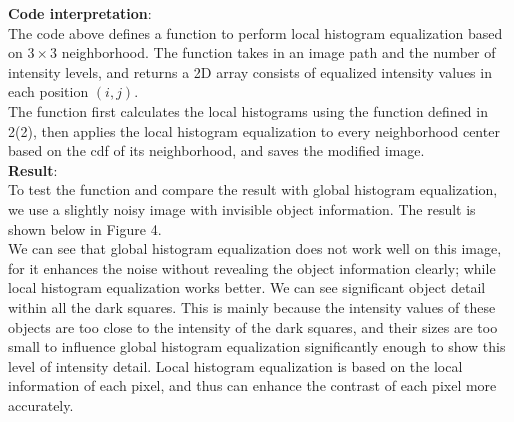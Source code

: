 \documentclass[UTF8]{ctexart}
\begin{document}
\textbf{Code interpretation}:\\
The code above defines a function to perform local histogram equalization based on $3\times3$ neighborhood. 
The function takes in an image path and the number of intensity levels, and returns a 2D array consists of equalized intensity values in each position $(i,j)$.\\
The function first calculates the local histograms using the function defined in 2(2), then applies the local histogram equalization to every neighborhood center based on the cdf of its neighborhood, and saves the modified image.\\
\textbf{Result}:\\
To test the function and compare the result with global histogram equalization, we use a slightly noisy image with invisible object information. The result is shown below in Figure 4.\\
We can see that global histogram equalization does not work well on this image, for it enhances the noise without revealing the object information clearly; 
while local histogram equalization works better. We can see significant object detail within all the dark squares.
This is mainly because the intensity values of these objects are too close to the intensity of the dark squares, and their sizes are too small to influence global histogram equalization significantly enough to show this level of intensity detail.
Local histogram equalization is based on the local information of each pixel, and thus can enhance the contrast of each pixel more accurately.
\end{document}

